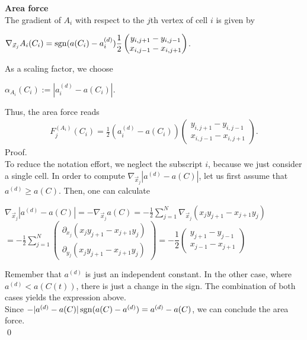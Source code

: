 \begin{proposition} \textbf{Area force} \\
	The gradient of $A_i$ with respect to the $j$th vertex of cell $i$ is given by 
	\begin{center}
		$\nabla_{\vec{x}_j} A_i(C_i) = \operatorname{sgn}(a(C_i) - a_i^{(d)}) \dfrac{1}{2} \begin{pmatrix} y_{i,j+1} - y_{i,j-1} \\ x_{i,j-1} - x_{i,j+1} \end{pmatrix}$. 
	\end{center}
	As a scaling factor, we choose
	\begin{center}
		$\alpha_{A_i}(C_i) := | a_i^{(d)} - a(C_i) |$. 
	\end{center}
	Thus, the area force reads 
	\begin{align}
		F_{j}^{(A_i)}(C_i) = \frac{1}{2}( a_i^{(d)} - a(C_i)) \begin{pmatrix} y_{i,j+1} - y_{i,j-1} \\ x_{i,j-1} - x_{i,j+1} \end{pmatrix}.
	\end{align}
	Proof.\\
	To reduce the notation effort, we neglect the subscript $i$, because we just consider a single cell.
	In order to compute $\nabla_{\vec{x}_j} | a^{(d)} - a(C) |$, let us first assume that $a^{(d)} \geq a(C)$. Then, one can calculate
	\begin{center}
		$
		\nabla_{\vec{x}_j} | a^{(d)} - a(C) | = - \nabla_{\vec{x}_j} a(C)
		= - \frac{1}{2}\sum\limits_{j = 1}^{N} \nabla_{\vec{x}_j} (x_{j} y_{j+1} - x_{j+1} y_{j})$ \\ \smallskip 
		$=- \frac{1}{2}\sum\limits_{j = 1}^{N} \begin{pmatrix} \partial_{x_j}  (x_{j} y_{j+1} - x_{j+1} y_{j})\\ \partial_{y_j} (x_{j} y_{j+1} - x_{j+1} y_{j})\end{pmatrix} 
		= - \dfrac{1}{2} \begin{pmatrix} y_{j+1} - y_{j-1} \\ x_{j-1} - x_{j+1} \end{pmatrix}
		$
	\end{center}
	
	Remember that $a^{(d)}$ is just an independent constant. In the other case, where $a^{(d)} < a(C(t))$, there is just a change in the sign. The combination of both cases yields the expression above. \\ 
	Since $- | a^{(d)} - a(C) | \operatorname{sgn}(a(C) - a^{(d)}) = a^{(d)} - a(C)$, we can conclude the area force. \\
	\qed
\end{proposition}


